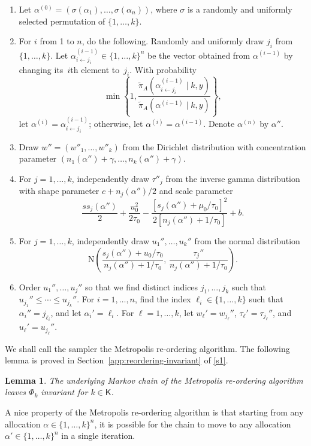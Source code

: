 \documentclass[12pt]{article}
\newtheorem{lemma}[theorem]{Lemma}
\begin{document}
\begin{enumerate}
	\item Let $\alpha^{(0)} = (\sigma(\alpha_1), \dots, \sigma(\alpha_n))$, where $\sigma$ is a randomly and uniformly selected permutation of $\{1,\dots,k\}$.
	\item 
	For $i$ from 1 to $n$, do the following.
	Randomly and uniformly draw $j_i$ from $\{1,\dots,k\}$.
	Let $\alpha^{(i-1)}_{i \leftarrow j_i} \in \{1,\dots,k\}^n$ be the vector obtained from $\alpha^{(i-1)}$ by changing its~$i$th element to~$j_i$.
	With probability
	\[
	\min \left\{ 1, \frac{\tilde{\pi}_A(\alpha^{(i-1)}_{i \leftarrow j_i} \mid k, y)}{\tilde{\pi}_A(\alpha^{(i-1)} \mid k, y)} \right\},
	\]
	let $\alpha^{(i)} = \alpha^{(i-1)}_{i \leftarrow j_i}$; otherwise, let $\alpha^{(i)} = \alpha^{(i-1)}$.
	Denote $\alpha^{(n)}$ by $\alpha''$.
	
	\item 
	Draw $w'' = (w''_1, \dots, w''_k)$ from the Dirichlet distribution with concentration parameter $(n_1(\alpha'') + \gamma, \dots, n_k(\alpha'') + \gamma)$.
	
	\item 
	For $j = 1,\dots, k$, independently draw $\tau''_j$ from the inverse gamma distribution with shape parameter $c + n_j(\alpha'')/2$ and scale parameter
	\[
	\frac{\mathit{ss}_j(\alpha'')}{2} + \frac{u_0^2}{2\tau_0} - \frac{[s_j(\alpha'')+\mu_0/\tau_0]^2}{2[ n_j(\alpha'') + 1/\tau_0]} + b.
	\]
	
	\item For $j = 1,\dots,k$, independently draw $u_1'', \dots, u_k''$ from the normal distribution
	\[
	\mbox{N} \left( \frac{s_j(\alpha'') + u_0/\tau_0}{n_j(\alpha'') + 1/\tau_0}, \, \frac{\tau_j''}{n_j(\alpha'') + 1/\tau_0} \right).
	\]
	
	\item 
	Order $u_1'', \dots, u_j''$ so that we find distinct indices $j_1, \dots, j_k$ such that $u_{j_1}'' \leq \cdots \leq u_{j_k}''$.
	For $i = 1,\dots,n$, find the index $\ell_i \in \{1,\dots,k\}$ such that $\alpha_i'' = j_{\ell_i}$, and let $\alpha_i' = \ell_i$.
	For $\ell = 1,\dots,k$, let $w_{\ell}' = w_{j_{\ell}}''$, $\tau_{\ell}' = \tau_{j_{\ell}}''$, and $u_{\ell}' = u_{j_{\ell}}''$.
\end{enumerate}

We shall call the sampler the Metropolis re-ordering algorithm.
The following lemma is proved in Section~\ref{app:reordering-invariant} of \ref{s1}.
\begin{lemma} \label{lem:reordering}
	The underlying Markov chain of the Metropolis re-ordering algorithm leaves $\Phi_k$ invariant for $k \in \mathsf{K}$.
\end{lemma}
A nice property of the Metropolis re-ordering algorithm is that starting from any allocation $\alpha \in \{1,\dots,k\}^n$, it is possible for the chain to move to any allocation $\alpha' \in \{1,\dots,k\}^n$ in a single iteration.
\end{document}
